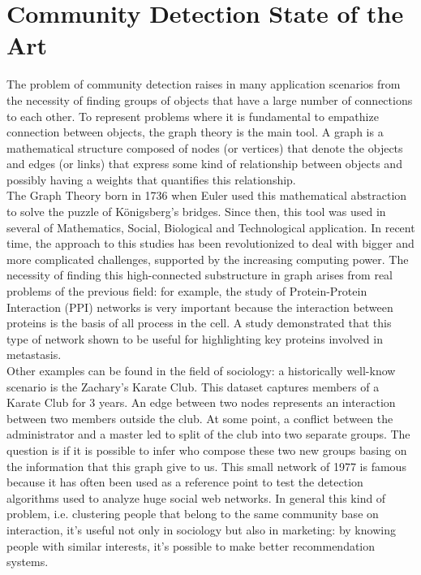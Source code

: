 \section{Community Detection State of the Art}
The problem of community detection raises in many application scenarios from the necessity of finding groups of objects that have a large number of connections to each other. To represent problems where it is fundamental to empathize connection between objects, the graph theory is the main tool. A graph is a mathematical structure composed of nodes (or vertices) that denote the objects and edges (or links) that express some kind of relationship between objects and possibly having a weights that quantifies this relationship.\\
The Graph Theory born in 1736 when Euler used this mathematical abstraction to solve the puzzle of Königsberg’s bridges. Since then, this tool was used in several of Mathematics, Social, Biological and Technological application. In recent time, the approach to this studies has been revolutionized to deal with bigger and more complicated challenges, supported by the increasing computing power. 
The necessity of finding this high-connected substructure in graph arises from real problems of the previous field: for example, the study of Protein-Protein Interaction (PPI) networks is very important because the interaction between proteins is the basis of all process in the cell. A study demonstrated that this type of network shown to be useful for highlighting key proteins involved in metastasis. \cite{metastasis} \\
Other examples can be found in the field of sociology: a historically well-know scenario is the Zachary's Karate Club. This dataset captures members of a Karate Club for 3 years.\cite{Zac77} An edge between two nodes represents an interaction between two members outside the club. At some point, a conflict between the administrator and a master led to split of the club into two separate groups. The question is if it is possible to infer who compose these two new groups basing on the information that this graph give to us. 
This small network of 1977 is famous because it has often been used as a reference point to test the detection algorithms used to analyze huge social web networks.
In general this kind of problem, i.e. clustering people that belong to the same community base on interaction, it's useful not only in sociology but also in marketing: by knowing people with similar interests, it's possible to make better recommendation systems.\\
